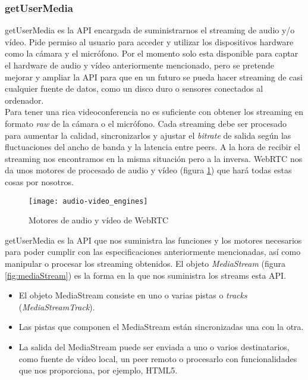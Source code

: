 \subsubsection{getUserMedia} 

getUserMedia es la API encargada de suministrarnos el streaming de audio y/o vídeo. Pide permiso al usuario para acceder y utilizar los dispositivos hardware como la cámara y el micrófono. Por el momento solo esta disponible para captar el hardware de audio y vídeo anteriormente mencionado, pero se pretende mejorar y ampliar la API para que en un futuro se pueda hacer streaming de casi cualquier fuente de datos, como un disco duro o sensores conectados al ordenador.\\

Para tener una rica videoconferencia no es suficiente con obtener los streaming en formato \textit{raw} de la cámara o el micrófono. Cada streaming debe ser procesado para aumentar la calidad, sincronizarlos y ajustar el \textit{bitrate} de salida según las fluctuaciones del ancho de banda y la latencia entre peers. A la hora de recibir el streaming nos encontramos en la misma situación pero a la inversa. WebRTC nos da unos motores de procesado de audio y vídeo (figura \ref{fig:audio-video_engines}) que hará todas estas cosas por nosotros.\\

\begin{figure}[htb]
\centering
\texttt{[image: audio-video\_engines]}
\caption{Motores de audio y vídeo de WebRTC }
\label{fig:audio-video_engines}
\end{figure}

getUserMedia es la API que nos suministra las funciones y los motores necesarios para poder cumplir con las especificaciones anteriormente mencionadas, así como manipular o procesar los streaming obtenidos. El objeto \textit{MediaStream} (figura \ref{fig:mediaStream}) es la forma en la que nos suministra los streams esta API.\\

\begin{itemize}
\item El objeto MediaStream consiste en uno o varias pistas o \textit{tracks} (\textit{MediaStreamTrack}).
\item Las pistas que componen el MediaStream están sincronizadas una con la otra.
\item La salida del MediaStream puede ser enviada a uno o varios destinatarios, como fuente de vídeo local, un peer remoto o procesarlo con funcionalidades que nos proporciona, por ejemplo, HTML5.
\end{itemize}

